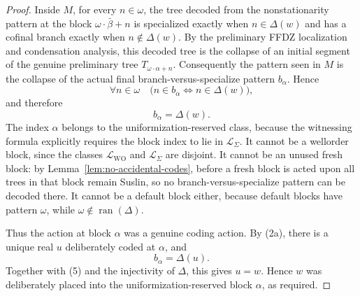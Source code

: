 \documentclass[10pt,a4paper]{amsart}
\begin{document}
\begin{proof}
Inside $M$, for every $n\in\omega$, the tree decoded from the nonstationarity
pattern at the block $\omega\cdot\bar\beta+n$ is specialized exactly when
$n\in\Delta(w)$ and has a cofinal branch exactly when $n\notin\Delta(w)$.  By the
preliminary FFDZ localization and condensation analysis, this decoded tree is the
collapse of an initial segment of the genuine preliminary tree
$T_{\omega\cdot\alpha+n}$.  Consequently the pattern seen in $M$ is the collapse
of the actual final branch-versus-specialize pattern $b_\alpha$.  Hence
\[
\forall n\in\omega\quad
\bigl(n\in b_\alpha\Longleftrightarrow n\in\Delta(w)\bigr),
\]
and therefore
\[
b_\alpha=\Delta(w).                            \tag{5}
\]
The index $\alpha$ belongs to the uniformization-reserved class, because the
witnessing formula explicitly requires the block index to lie in
$\mathcal L_\Sigma$.  It cannot be a wellorder block, since the classes
$\mathcal L_{\mathrm{WO}}$ and $\mathcal L_\Sigma$ are disjoint.  It cannot be an
unused fresh block: by Lemma~\ref{lem:no-accidental-codes}, before a fresh block
is acted upon all trees in that block remain Suslin, so no
branch-versus-specialize pattern can be decoded there.  It cannot be a default
block either, because default blocks have pattern $\omega$, while
$\omega\notin\operatorname{ran}(\Delta)$.

Thus the action at block $\alpha$ was a genuine coding action.  By (2a), there is a
unique real $u$ deliberately coded at $\alpha$, and
\[
b_\alpha=\Delta(u).
\]
Together with (5) and the injectivity of $\Delta$, this gives $u=w$.  Hence $w$ was
deliberately placed into the uniformization-reserved block $\alpha$, as required.
\end{proof}
\end{document}
